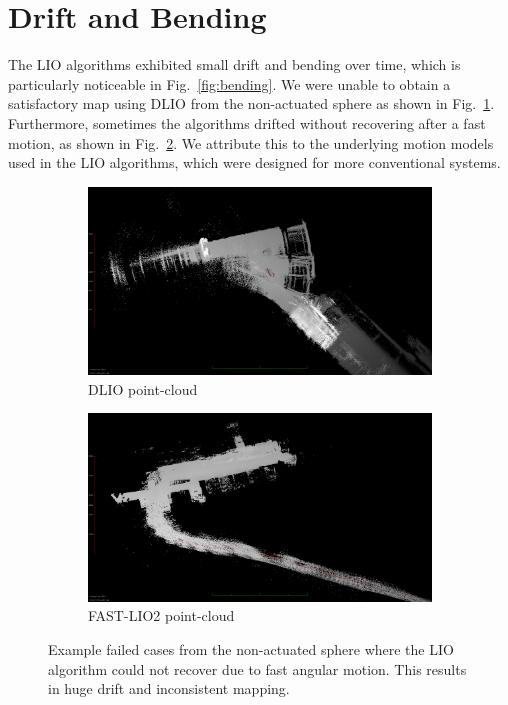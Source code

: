 \documentclass[english, bachelor, utf8]{base/thesis_telematics}
\begin{document}
\section{Drift and Bending}
The LIO algorithms exhibited small drift and bending over time, which is particularly noticeable in Fig.~\ref{fig:bending}. 
We were unable to obtain a satisfactory map using DLIO from the non-actuated sphere as shown in Fig.~\ref{fig:dlio_drift}.
Furthermore, sometimes the algorithms drifted without recovering after a fast motion, as shown in Fig.~\ref{fig:lio_drift}. 
We attribute this to the underlying motion models used in the LIO algorithms, which were designed for more conventional systems.

\begin{figure}[h]
\centering
\begin{subfigure}{0.49\columnwidth}
    \centering
    \includegraphics[width=\textwidth]{pics/drifts_bending/dlio_drift.png}
    \caption{DLIO point-cloud}\label{fig:dlio_drift}
\end{subfigure}
\begin{subfigure}{0.49\columnwidth}
    \centering
    \includegraphics[width=\textwidth]{pics/drifts_bending/lio_drifts.png}
    \caption{FAST-LIO2 point-cloud}\label{fig:lio_drift}
\end{subfigure}
\caption{Example failed cases from the non-actuated sphere where the LIO algorithm could not recover due to fast angular motion.
This results in huge drift and inconsistent mapping.}\vspace{-3mm}
\label{fig:drift}
\end{figure}
\end{document}
